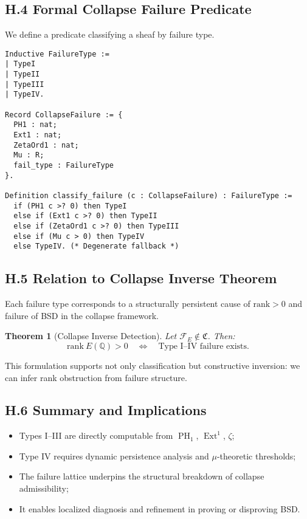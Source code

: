 \documentclass[11pt]{article}
\newtheorem{theorem}{Theorem}[section]
\DeclareMathOperator{\Ext}{Ext}
\DeclareMathOperator{\PH}{PH}
\begin{document}
\subsection*{H.4 Formal Collapse Failure Predicate}

We define a predicate classifying a sheaf by failure type.

\begin{lstlisting}[language=Coq]
Inductive FailureType :=
| TypeI
| TypeII
| TypeIII
| TypeIV.

Record CollapseFailure := {
  PH1 : nat;
  Ext1 : nat;
  ZetaOrd1 : nat;
  Mu : R;
  fail_type : FailureType
}.

Definition classify_failure (c : CollapseFailure) : FailureType :=
  if (PH1 c >? 0) then TypeI
  else if (Ext1 c >? 0) then TypeII
  else if (ZetaOrd1 c >? 0) then TypeIII
  else if (Mu c > 0) then TypeIV
  else TypeIV. (* Degenerate fallback *)
\end{lstlisting}

\subsection*{H.5 Relation to Collapse Inverse Theorem}

Each failure type corresponds to a structurally persistent cause of \( \mathrm{rank} > 0 \) and failure of BSD in the collapse framework.

\begin{theorem}[Collapse Inverse Detection]
Let \( \mathcal{F}_E \notin \mathfrak{C} \). Then:
\[
\mathrm{rank}~E(\mathbb{Q}) > 0 \quad \Leftrightarrow \quad \text{Type I–IV failure exists}.
\]
\end{theorem}

This formulation supports not only classification but constructive inversion: we can infer rank obstruction from failure structure.

\subsection*{H.6 Summary and Implications}

\begin{itemize}
  \item Types I–III are directly computable from \(\PH_1\), \(\Ext^1\), \(\zeta\);
  \item Type IV requires dynamic persistence analysis and \(\mu\)-theoretic thresholds;
  \item The failure lattice underpins the structural breakdown of collapse admissibility;
  \item It enables localized diagnosis and refinement in proving or disproving BSD.
\end{itemize}
\end{document}
